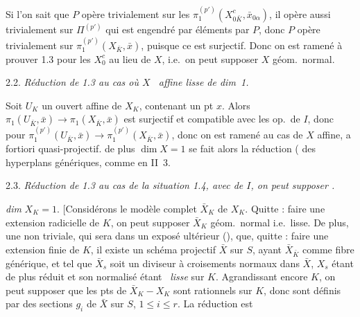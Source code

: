 \documentclass[11pt,a4paper]{article}
\begin{document}
 Si l'on sait que $P$ opère trivialement sur les $\pi_1^{(p')}(X^c_{0\bar K}, \bar x_{0\alpha})$, il opère aussi trivialement sur $\Pi^{(p')}$ qui est engendré par  éléments    \struck{\ill{}} par $P$, donc $P$ opère trivialement sur  $\pi_1^{(p')}(X_{\bar K}, \bar x)$, puisque ce  est surjectif. Donc on est ramené \struck{\ill{}} à prouver 1.3 pour les $X^c_0$ au lieu de $X$, i.e.\ on peut supposer $X$  géom.\ normal.

2.2. \emph{Réduction de 1.3 au cas où $X$ \ affine lisse de dim~1.}

Soit $U_K$ un ouvert affine  de $X_K$,  contenant un pt \struck{\ill{}} $x$. Alors $\pi_1(U_{\bar K}, \bar x) \to \pi_1(X_{\bar K}, \bar x)$ est surjectif et compatible avec les op.\ de $I$, donc  pour $\pi_1^{(p')}(U_{\bar K}, \bar x) \to \pi_1^{(p')}(X_{\bar K}, \bar x)$, donc on est ramené au cas de $X$ affine, a fortiori quasi-projectif.  de plus $\dim X = 1$ se fait alors  la réduction ( des hyperplans génériques, comme en II~3. 

2.3. \emph{Réduction de 1.3 au cas de la situation 1.4, avec  de $I$, on peut supposer \ill{} \ill{}.}

\struck{\ill{}} \emph{dim} $X_K = 1$. [Considérons le modèle complet $\bar X_K$ de $X_K$. Quitte : faire une extension radicielle de $K$, on peut supposer $\bar X_K$ géom.\ normal i.e.\ lisse. De plus, une  non triviale, qui sera  dans un exposé ultérieur (\quad),  que, quitte : \struck{\ill{}} faire une extension finie de $K$, il existe un \struck{\ill{}} schéma projectif $\bar X$ sur $S$, ayant $\bar X_{\bar K}$ comme fibre générique, et tel que $\bar X_s$ soit  un diviseur à croisements normaux dans $\bar X$, $X_s$ étant de plus réduit et son normalisé étant \ \emph{lisse} sur $K$. Agrandissant encore $K$, on peut supposer que les pts de $\bar X_K - X_K$ sont rationnels sur $K$, donc  sont définis par des sections $g_i$ de $\bar X$ sur $S$, $1 \leqslant i \leqslant r$. La réduction est
\end{document}
